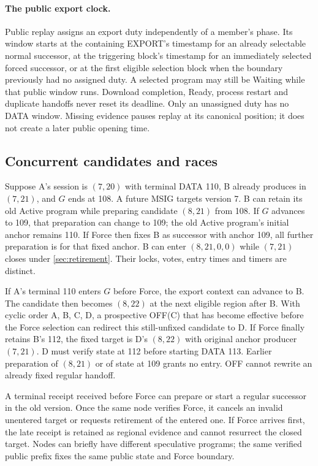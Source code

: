 \documentclass[11pt,a4paper]{article}
\begin{document}
\paragraph{The public export clock.}
Public replay assigns an export duty independently of a member's
phase. Its window starts at the containing EXPORT's timestamp for
an already selectable normal successor, at the triggering block's
timestamp for an immediately selected forced successor, or at the
first eligible selection block when the boundary previously had no
assigned duty. A selected program may still be Waiting while that
public window runs. Download completion, Ready, process restart and
duplicate handoffs never reset its deadline. Only an unassigned duty
has no DATA window. Missing evidence pauses replay at its canonical
position; it does not create a later public opening time.

\subsection{Concurrent candidates and races}
\label{sec:runtime-races}
Suppose A's session is $(7,20)$ with terminal DATA 110, B already
produces in $(7,21)$, and $G$ ends at 108. A future MSIG targets
version 7. B can retain its old Active program while preparing
candidate $(8,21)$ from 108. If $G$ advances to 109, that preparation
can change to 109; the old Active program's initial anchor remains
110. If Force then fixes B as successor with anchor 109, all further
preparation is for that fixed anchor. B can enter $(8,21,0,0)$ while
$(7,21)$ closes under \cref{sec:retirement}. Their locks, votes,
entry times and timers are distinct.

If A's terminal 110 enters $G$ before Force, the export context can
advance to B. The candidate then becomes $(8,22)$ at the next eligible
region after B. With cyclic order A, B, C, D, a prospective OFF(C)
that has become effective before the Force selection can redirect
this still-unfixed candidate to D. If Force finally retains B's 112,
the fixed target is D's $(8,22)$ with original anchor producer
$(7,21)$. D must verify state at 112 before starting DATA 113.
Earlier preparation of $(8,21)$ or of state at 109 grants no entry.
OFF cannot rewrite an already fixed regular handoff.

A terminal receipt received before Force can prepare or start a
regular successor in the old version. Once the same node verifies
Force, it cancels an invalid unentered target or requests retirement
of the entered one. If Force arrives first, the late receipt is
retained as regional evidence and cannot resurrect the closed target.
Nodes can briefly have different speculative programs; the same
verified public prefix fixes the same public state and Force boundary.
\end{document}
